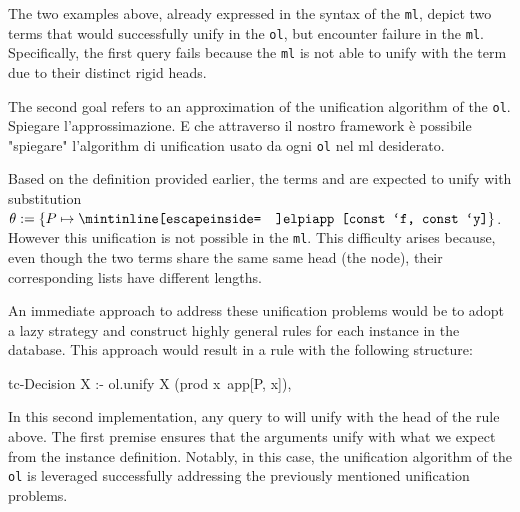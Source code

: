 \documentclass[acmengage]{acmart}
\newcommand*{\acronym}[1]{\texttt{#1}\xspace}
\def\ol{\acronym{ol}} %
\def\ml{\acronym{ml}} %
\begin{document}
%

\noindent The two examples above, already expressed in the syntax of the \ml,
depict two terms that would successfully unify in the \ol, but encounter failure
in the \ml. Specifically, the first query fails because the \ml is not able to unify  with the term  due to their distinct rigid heads. 

The second goal refers to an approximation of the unification algorithm of the \ol. Spiegare l'approssimazione. E che
attraverso il nostro framework è possibile "spiegare" l'algorithm di unification
usato da ogni \ol nel ml desiderato. 

Based on the definition provided earlier, the terms  and  are expected to unify with substitution $\theta := \{P
\mapsto \texttt{\elpiIn{app [const `f, const `y]}} \}$. However this unification
is not possible in the \ml. This difficulty arises because, even though 
the two terms share the same same head
(the  node), their corresponding lists have different lengths.

An immediate approach to address these unification problems
would be to adopt a lazy strategy and construct highly general rules for each instance in the database.
This approach would result in a rule with the following structure:

\begin{center}
  \begin{minipage}[c]{0.46\linewidth}
    \begin{elpicode}
      tc-Decision X :- 
        ol.unify X (prod x\ app[P, x]),
    \end{elpicode}
  \end{minipage}
\end{center}

\noindent In this second implementation, any query to 
will unify with the head of the rule above. The first
premise ensures that the arguments unify with what we expect from the
instance definition. Notably, in this case, the unification algorithm of
the \ol is leveraged successfully addressing the previously mentioned unification problems.
\end{document}
